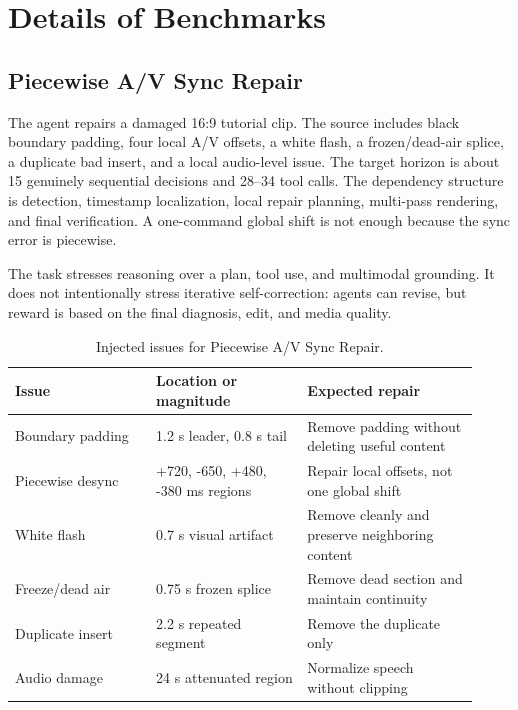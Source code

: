 \documentclass[11pt]{article}
\begin{document}
\section{Details of Benchmarks}

\subsection{Piecewise A/V Sync Repair}

The agent repairs a damaged 16:9 tutorial clip. The source includes black boundary padding, four local A/V offsets, a white flash, a frozen/dead-air splice, a duplicate bad insert, and a local audio-level issue. The target horizon is about 15 genuinely sequential decisions and 28--34 tool calls. The dependency structure is detection, timestamp localization, local repair planning, multi-pass rendering, and final verification. A one-command global shift is not enough because the sync error is piecewise.

The task stresses reasoning over a plan, tool use, and multimodal grounding. It does not intentionally stress iterative self-correction: agents can revise, but reward is based on the final diagnosis, edit, and media quality.

\begin{table}[H]
\centering
\small
\begin{tabular}{p{0.28\linewidth}p{0.30\linewidth}p{0.34\linewidth}}
\toprule
Issue & Location or magnitude & Expected repair \\
\midrule
Boundary padding & 1.2 s leader, 0.8 s tail & Remove padding without deleting useful content \\
Piecewise desync & +720, -650, +480, -380 ms regions & Repair local offsets, not one global shift \\
White flash & 0.7 s visual artifact & Remove cleanly and preserve neighboring content \\
Freeze/dead air & 0.75 s frozen splice & Remove dead section and maintain continuity \\
Duplicate insert & 2.2 s repeated segment & Remove the duplicate only \\
Audio damage & 24 s attenuated region & Normalize speech without clipping \\
\bottomrule
\end{tabular}
\caption{Injected issues for Piecewise A/V Sync Repair.}
\end{table}
\end{document}
